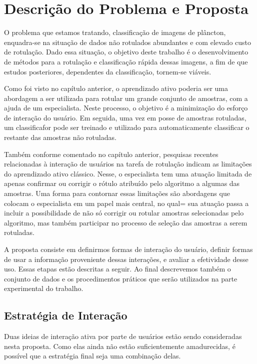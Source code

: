 \chapter{Descrição do Problema e Proposta}
\label{cap:Proposta}

O problema que estamos tratando, classificação de imagens de plâncton, enquadra-se na situação de dados não rotulados abundantes e com elevado custo de rotulação. Dado essa situação, o objetivo deste trabalho é o desenvolvimento de métodos para a rotulação e classificação rápida dessas imagens, a fim de que estudos posteriores, dependentes da classificação, tornem-se viáveis. 

Como foi visto no capítulo anterior, o aprendizado ativo poderia ser uma abordagem a ser utilizada para rotular um grande conjunto de amostras, com a ajuda de um especialista. Neste processo, o objetivo é a minimização do esforço de interação do usuário. Em seguida, uma vez em posse de amostras rotuladas, um classificafor pode ser treinado e utilizado para automaticamente classificar o restante das amostras não rotuladas.

Também conforme comentado no capítulo anterior, pesquisas recentes relacionadas à interação de usuários na tarefa de rotulação indicam as limitações do aprendizado ativo clássico. Nesse, o especialista tem uma atuação limitada de apenas confirmar ou corrigir o rótulo atribuído pelo algoritmo a algumas das amostras. Uma forma para contornar essas limitações são abordagens que colocam o especialista em um papel mais central, no qual= sua atuação passa a incluir a possibilidade de não só corrigir ou rotular amostras selecionadas pelo algoritmo, mas também participar no processo de seleção das amostras a serem rotuladas.

A proposta consiste em definirmos formas de interação do usuário, definir formas de usar a informação proveniente dessas interações, e avaliar a efetividade desse uso. Essas etapas estão descritas a seguir. Ao final descrevemos também o conjunto de dados e os procedimentos práticos que serão utilizados na parte experimental do trabalho.


\section{Estratégia de Interação}
\label{sec:estategia_interacao}

Duas ideias de interação ativa por parte de usuários estão  sendo consideradas nesta proposta. Como elas ainda não estão suficientemente amadurecidas, é possível que a estratégia final seja uma combinação delas.

